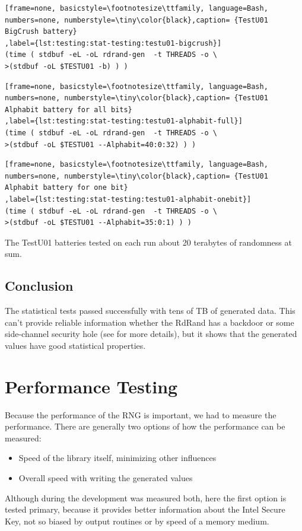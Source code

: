 \begin{lstlisting}[frame=none, basicstyle=\footnotesize\ttfamily, language=Bash, numbers=none, numberstyle=\tiny\color{black},caption= {TestU01 BigCrush battery}
,label={lst:testing:stat-testing:testu01-bigcrush}]
(time ( stdbuf -eL -oL rdrand-gen  -t THREADS -o \
>(stdbuf -oL $TESTU01 -b) ) )
\end{lstlisting}

\begin{lstlisting}[frame=none, basicstyle=\footnotesize\ttfamily, language=Bash, numbers=none, numberstyle=\tiny\color{black},caption= {TestU01 Alphabit battery for all bits}
,label={lst:testing:stat-testing:testu01-alphabit-full}]
(time ( stdbuf -eL -oL rdrand-gen  -t THREADS -o \
>(stdbuf -oL $TESTU01 --Alphabit=40:0:32) ) ) 
\end{lstlisting}

\begin{lstlisting}[frame=none, basicstyle=\footnotesize\ttfamily, language=Bash, numbers=none, numberstyle=\tiny\color{black},caption= {TestU01 Alphabit battery for one bit}
,label={lst:testing:stat-testing:testu01-alphabit-onebit}]
(time ( stdbuf -eL -oL rdrand-gen  -t THREADS -o \
>(stdbuf -oL $TESTU01 --Alphabit=35:0:1) ) ) 
\end{lstlisting}

\par{
The TestU01 batteries tested on each run about 20 terabytes of randomness at sum. 
}


\subsection{Conclusion}
\par{
The statistical tests passed successfully with tens of TB of generated data. This can't provide reliable information whether the RdRand has a backdoor or some side-channel security hole (see  for more details), but it shows that the generated values have good statistical properties.
}

\section{Performance Testing} \label{sec:testing:performance-testing}
\par{
Because the performance of the RNG is important, we had to measure the performance. There are generally two options of how the performance can be measured:
\begin{itemize}
 \item Speed of the library itself, minimizing other influences
 \item Overall speed with writing the generated values
\end{itemize}
Although during the development was measured both, here the first option is tested primary, because it provides better information about the Intel Secure Key, not so biased by output routines or by speed of a memory medium. 
}

